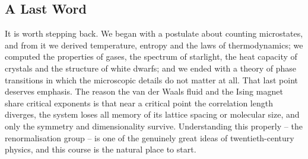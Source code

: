 \subsection{A Last Word}

It is worth stepping back. We began with a postulate about counting microstates, and from it we derived temperature, entropy and the laws of thermodynamics; we computed the properties of gases, the spectrum of starlight, the heat capacity of crystals and the structure of white dwarfs; and we ended with a theory of phase transitions in which the microscopic details do not matter at all. That last point deserves emphasis. The reason the van der Waals fluid and the Ising magnet share critical exponents is that near a critical point the correlation length diverges, the system loses all memory of its lattice spacing or molecular size, and only the symmetry and dimensionality survive. Understanding this properly -- the renormalisation group -- is one of the genuinely great ideas of twentieth-century physics, and this course is the natural place to start.

